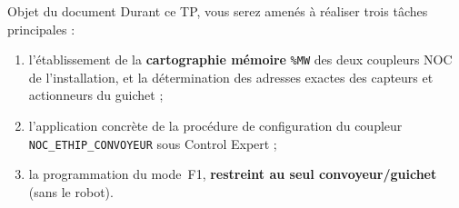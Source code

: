 \begin{UPSTIinfor}{Objet du document}
Durant ce TP, vous serez amenés à réaliser trois tâches principales :
\begin{enumerate}
    \item l'établissement de la \textbf{cartographie mémoire} \texttt{\%MW}
    des deux coupleurs NOC de l'installation, et la détermination des
    adresses exactes des capteurs et actionneurs du guichet ;
    \item l'application concrète de la procédure de configuration du
    coupleur \texttt{NOC\_ETHIP\_CONVOYEUR} sous Control Expert ;
    \item la programmation du mode~F1, \textbf{restreint au seul
    convoyeur/guichet} (sans le robot).
\end{enumerate}
\end{UPSTIinfor}
